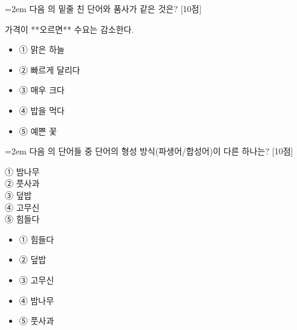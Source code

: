 \documentclass[11pt,a4paper]{article}
\newcommand{\qnum}[1]{%
  \tikz[baseline=(num.base)]{%
    \node[circle, fill=numCircle, text=white, inner sep=0pt,
          minimum size=18pt, font=\small\bfseries] (num) {#1};%
  }%
}
\newcommand{\pts}[1]{%
  \hfill\textcolor{ptsBadge}{[#1점]}%
}
\begin{document}
\vspace{4mm}
\begin{minipage}{\columnwidth}
{\hangindent=2em
\qnum{12}\enspace 다음 의 밑줄 친 단어와 품사가 같은 것은? \pts{10}
\par}

\vspace{3mm}
\begin{tcolorbox}[bogi]
가격이 **오르면** 수요는 감소한다.
\end{tcolorbox}
\vspace{3mm}
\begin{itemize}[leftmargin=2.5em, labelsep=0.3em, label={}, itemsep=4pt, parsep=1pt, topsep=0pt]
  \item ① 맑은 하늘
  \item ② 빠르게 달리다
  \item ③ 매우 크다
  \item ④ 밥을 먹다
  \item ⑤ 예쁜 꽃
\end{itemize}
\end{minipage}
\vspace{4mm}

\vspace{4mm}
\begin{minipage}{\columnwidth}
{\hangindent=2em
\qnum{13}\enspace 다음 의 단어들 중 단어의 형성 방식(파생어/합성어)이 다른 하나는? \pts{10}
\par}

\vspace{3mm}
\begin{tcolorbox}[bogi]
① 밤나무 \\{}
② 풋사과 \\{}
③ 덮밥 \\{}
④ 고무신 \\{}
⑤ 힘들다
\end{tcolorbox}
\vspace{3mm}
\begin{itemize}[leftmargin=2.5em, labelsep=0.3em, label={}, itemsep=4pt, parsep=1pt, topsep=0pt]
  \item ① 힘들다
  \item ② 덮밥
  \item ③ 고무신
  \item ④ 밤나무
  \item ⑤ 풋사과
\end{itemize}
\end{minipage}
\vspace{4mm}
\end{document}
